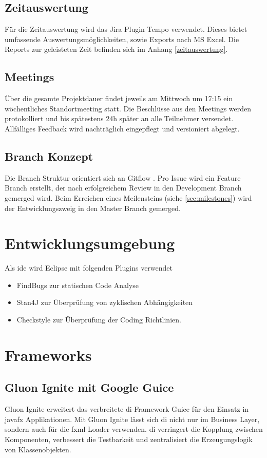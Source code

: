 \documentclass[11pt,a4paper,english,oneside]{book}
\numberwithin{equation}{chapter}
\begin{document}
	\subsection{Zeitauswertung}
	Für die Zeitauswertung wird das Jira Plugin Tempo \cite{jiratempo} verwendet. Dieses bietet umfassende Auswertungsmöglichkeiten, sowie Exports nach MS Excel. Die Reports zur geleisteten Zeit befinden sich im Anhang \ref{zeitauswertung}.
	
	\subsection{Meetings} \label{ssec:meeting}
	Über die gesamte Projektdauer findet jeweils am Mittwoch um 17:15 ein wöchentliches Standortmeeting statt. Die Beschlüsse aus den Meetings werden protokolliert und bis spätestens 24h später an alle Teilnehmer versendet. Allfälliges Feedback wird nachträglich eingepflegt und versioniert abgelegt.
	
	\subsection{Branch Konzept}
	Die Branch Struktur orientiert sich an Gitflow \cite{gitflow}. Pro Issue wird ein Feature Branch erstellt, der nach erfolgreichem Review in den Development Branch gemerged wird. Beim Erreichen eines Meilensteins (siehe \ref{sec:milestones}) wird der Entwicklungszweig in den Master Branch gemerged.
	
	\section{Entwicklungsumgebung}
	Als \gls{ide} wird Eclipse mit folgenden Plugins verwendet
	\begin{itemize}
		\item FindBugs \cite{findbugs} zur statischen Code Analyse
		\item Stan4J \cite{stan4j} zur Überprüfung von zyklischen Abhängigkeiten
		\item Checkstyle \cite{checkstyle} zur Überprüfung der Coding Richtlinien.
	\end{itemize}

	\section{Frameworks}
	
	\subsection{Gluon Ignite mit Google Guice} \label{DI}
	Gluon Ignite \cite{gluonignite} erweitert das verbreitete \gls{di}-Framework Guice \cite{guice} für den Einsatz in \gls{javafx} Applikationen. Mit Gluon Ignite lässt sich \gls{di} nicht nur im Business Layer, sondern auch für die \gls{fxml} Loader verwenden. \gls{di} verringert die Kopplung zwischen Komponenten, verbessert die Testbarkeit und zentralisiert die Erzeugungslogik von Klassenobjekten.
\end{document}
